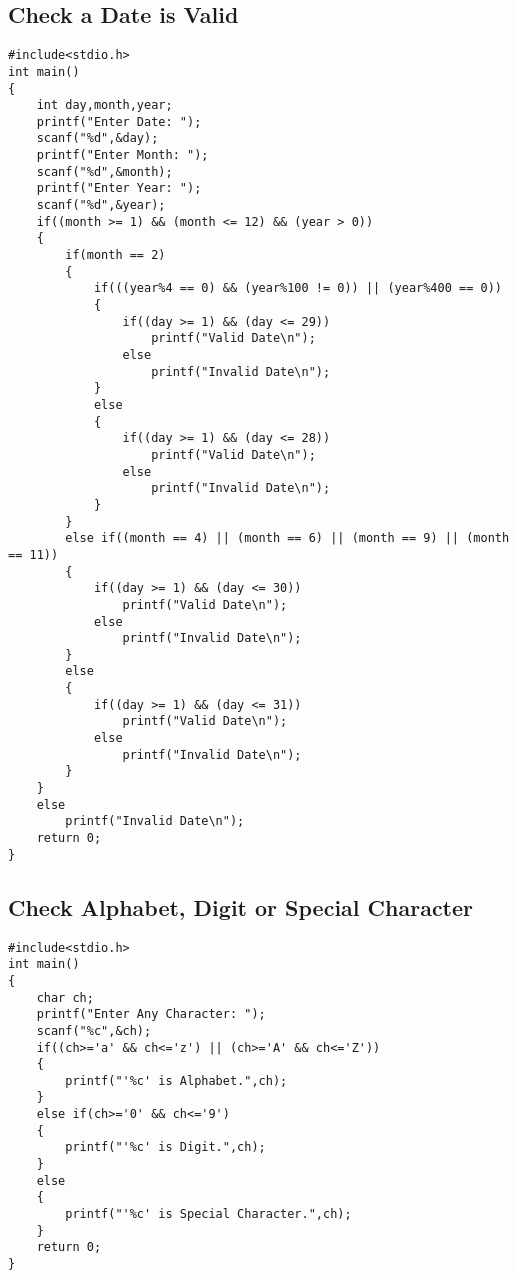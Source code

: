 \documentclass[a4paper,14pt]{article}
\begin{document}
\subsection{Check a Date is Valid}
\vspace{0.5cm}
\begin{lstlisting}[caption={Check a Date is Valid}]
#include<stdio.h>
int main()
{
    int day,month,year;
    printf("Enter Date: ");
    scanf("%d",&day);
    printf("Enter Month: ");
    scanf("%d",&month);
    printf("Enter Year: ");
    scanf("%d",&year);
    if((month >= 1) && (month <= 12) && (year > 0))
    {
        if(month == 2)
        {
            if(((year%4 == 0) && (year%100 != 0)) || (year%400 == 0))
            {
                if((day >= 1) && (day <= 29))
                    printf("Valid Date\n");
                else
                    printf("Invalid Date\n");
            }
            else
            {
                if((day >= 1) && (day <= 28))
                    printf("Valid Date\n");
                else
                    printf("Invalid Date\n");
            }
        }
        else if((month == 4) || (month == 6) || (month == 9) || (month == 11))
        {
            if((day >= 1) && (day <= 30))
                printf("Valid Date\n");
            else
                printf("Invalid Date\n");
        }
        else
        {
            if((day >= 1) && (day <= 31))
                printf("Valid Date\n");
            else
                printf("Invalid Date\n");
        }
    }
    else
        printf("Invalid Date\n");
    return 0;
}
\end{lstlisting}
\newpage

\subsection{Check Alphabet, Digit or Special Character}
\vspace{0.5cm}
\begin{lstlisting}[caption={Check Alphabet, Digit or Special Character}]
#include<stdio.h>
int main()
{
    char ch;
    printf("Enter Any Character: ");
    scanf("%c",&ch);
    if((ch>='a' && ch<='z') || (ch>='A' && ch<='Z'))
    {
        printf("'%c' is Alphabet.",ch);
    }
    else if(ch>='0' && ch<='9')
    {
        printf("'%c' is Digit.",ch);
    }
    else
    {
        printf("'%c' is Special Character.",ch);
    }
    return 0;
}
\end{lstlisting}
\newpage
\end{document}
